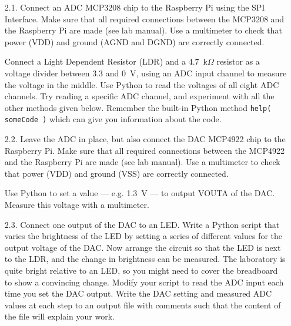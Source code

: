 \vspace*{-0.5cm}
\begin{enumerate}

\item [2.1.] Connect an ADC MCP3208 chip to the Raspberry Pi using the SPI Interface.
Make sure that all required connections between the MCP3208 and the Raspberry Pi are made (see lab manual).
Use a multimeter to check that power (VDD) and ground (AGND and DGND) are correctly connected.

Connect a Light Dependent Resistor (LDR) and a 4.7~k$\Omega$ resistor as a voltage divider between 3.3 and 0~V, using an ADC input channel to measure the voltage in the middle.
Use Python to read the voltages of all eight ADC channels.
Try reading a specific ADC channel, and experiment with all the other methods given below.
Remember the built-in Python method \texttt{help( someCode )} which can give you information about the code.


\vspace*{-0.5cm}

\newpage
\item [2.2.] Leave the ADC in place, but also connect the DAC MCP4922 chip to the Raspberry Pi.
Make sure that all required connections between the MCP4922 and the Raspberry Pi are made (see lab manual).
Use a multimeter to check that power (VDD) and ground (VSS) are correctly connected.

Use Python to set a value --- e.g. 1.3~V --- to output VOUTA of the DAC.
Measure this voltage with a multimeter. \\



\item [2.3.] Connect one output of the DAC to an LED.
Write a Python script that varies the brightness of the LED by setting a series of different values for the output voltage of the DAC.
Now arrange the circuit so that the LED is next to the LDR, and the change in brightness can be measured.
The laboratory is quite bright relative to an LED, so you might need to cover the breadboard to show a convincing change.
Modify your script to read the ADC input each time you set the DAC output.
Write the DAC setting and measured ADC values at each step to an output file with comments such that the content of the file will explain your work.

\end{enumerate}


